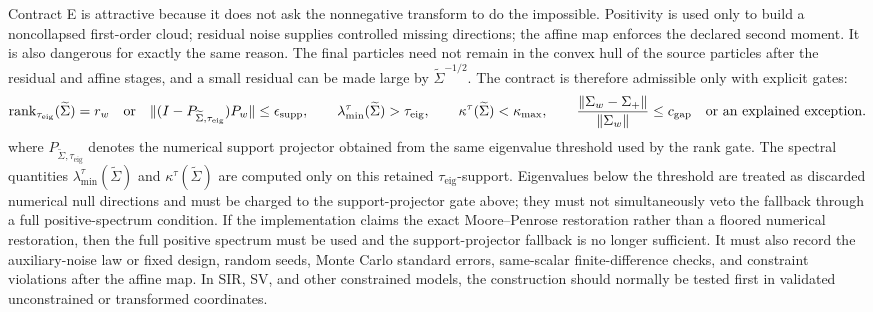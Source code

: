 Contract E is attractive because it does not ask the nonnegative transform to do
the impossible.  Positivity is used only to build a noncollapsed first-order
cloud; residual noise supplies controlled missing directions; the affine map
enforces the declared second moment.  It is also dangerous for exactly the same
reason.  The final particles need not remain in the convex hull of the source
particles after the residual and affine stages, and a small residual can be made
large by \(\widetilde\Sigma^{-1/2}\).  The contract is therefore admissible only
with explicit gates:
\[
  \operatorname{rank}_{\tau_{\mathrm{eig}}}(\widetilde\Sigma)=r_w
  \quad\hbox{or}\quad
  \|(I-P_{\widetilde\Sigma,\tau_{\mathrm{eig}}})P_w\|\le \epsilon_{\mathrm{supp}},
  \qquad
  \lambda_{\min}^{\tau}(\widetilde\Sigma)>\tau_{\mathrm{eig}},
  \qquad
  \kappa^{\tau}(\widetilde\Sigma)<\kappa_{\max},
  \qquad
  \frac{\|\Sigma_w-\Sigma_+\|}{\|\Sigma_w\|}\le c_{\mathrm{gap}}
  \quad\hbox{or an explained exception.}
\]
where \(P_{\widetilde\Sigma,\tau_{\mathrm{eig}}}\) denotes the numerical support
projector obtained from the same eigenvalue threshold used by the rank gate.
The spectral quantities
\(\lambda_{\min}^{\tau}(\widetilde\Sigma)\) and
\(\kappa^{\tau}(\widetilde\Sigma)\) are computed only on this retained
\(\tau_{\mathrm{eig}}\)-support.  Eigenvalues below the threshold are treated as
discarded numerical null directions and must be charged to the support-projector
gate above; they must not simultaneously veto the fallback through a full
positive-spectrum condition.  If the implementation claims the exact
Moore--Penrose restoration rather than a floored numerical restoration, then the
full positive spectrum must be used and the support-projector fallback is no
longer sufficient.
It must also record the auxiliary-noise law or fixed design, random seeds,
Monte Carlo standard errors, same-scalar finite-difference checks, and
constraint violations after the affine map.  In SIR, SV, and other constrained
models, the construction should normally be tested first in validated
unconstrained or transformed coordinates.

